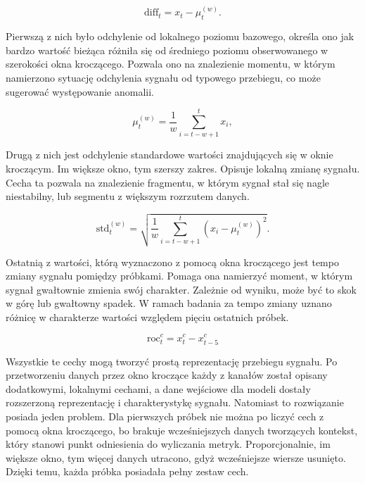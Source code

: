 \documentclass[a4paper,twoside,12pt]{book}
\begin{document}
\begin{equation}
	\text{diff}_t = x_t - \mu_t^{(w)}.
\end{equation}

Pierwszą z nich było odchylenie od lokalnego poziomu bazowego, określa ono jak bardzo wartość bieżąca różniła się od średniego poziomu obserwowanego w szerokości okna kroczącego. Pozwala ono na znalezienie momentu, w którym namierzono sytuację odchylenia sygnału od typowego przebiegu, co może sugerować występowanie anomalii. 

\begin{equation}
	\mu_t^{(w)} = \frac{1}{w} \sum_{i=t-w+1}^{t} x_i,
\end{equation}

Drugą z nich jest odchylenie standardowe wartości znajdujących się w oknie kroczącym. Im większe okno, tym szerszy zakres. Opisuje lokalną zmianę sygnału. Cecha ta pozwala na znalezienie fragmentu, w którym sygnał stał się nagle niestabilny, lub segmentu z większym rozrzutem danych.

\begin{equation}
	\text{std}_t^{(w)} =
	\sqrt{
		\frac{1}{w}
		\sum_{i=t-w+1}^{t}
		\left(x_i - \mu_t^{(w)}\right)^2
	}.
\end{equation}

Ostatnią z wartości, którą wyznaczono z pomocą okna kroczącego jest tempo zmiany sygnału pomiędzy próbkami. Pomaga ona namierzyć moment, w którym sygnał gwałtownie zmienia swój charakter. Zależnie od wyniku, może być to skok w górę lub gwałtowny spadek. W ramach badania za tempo zmiany uznano różnicę w charakterze wartości względem pięciu ostatnich próbek.

\begin{equation}
\text{roc}_t^c = x_t^c - x_{t-5}^c
\end{equation}



Wszystkie te cechy mogą tworzyć prostą reprezentację przebiegu sygnału. Po przetworzeniu danych przez okno kroczące każdy z kanałów został opisany dodatkowymi, lokalnymi cechami, a dane wejściowe dla modeli dostały rozszerzoną reprezentację i charakterystykę sygnału. Natomiast to rozwiązanie posiada jeden problem. Dla pierwszych próbek nie można po liczyć cech z pomocą okna kroczącego, bo brakuje wcześniejszych danych tworzących kontekst, który stanowi punkt odniesienia do wyliczania metryk. Proporcjonalnie, im większe okno, tym więcej danych utracono, gdyż wcześniejsze wiersze usunięto. Dzięki temu, każda próbka posiadała pełny zestaw cech.
\end{document}
